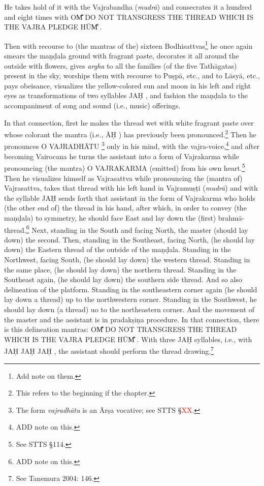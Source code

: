 \documentclass[11pt]{book}
\makeatletter
\def\fakesc#1{%
  \begingroup%
  \xdef\fake@name{\csname\curr@fontshape/\f@size\endcsname}%
  \fontsize{1.3\fontdimen8\fake@name}{\baselineskip}\selectfont%
  \uppercase{#1}%
  \endgroup%
}
\newcommand{\mantra}[1]{\fakesc{#1}}
\newcommand{\red}[1]{\textcolor{red}{#1}}
\newcommand{\skt}[1]{\emph{#1}}
\makeatother
\begin{document}
He takes hold of it with the Vajrabandha (\skt{mudrā}) and consecrates it a hundred and eight times with \mantra{om̐ do not transgress the thread which is the vajra pledge hūm̐}.

Then with recourse to (the mantras of the) sixteen Bodhisattvas\footnote{Add note on them.} he once again smears the maṇḍala ground with fragrant paste, decorates it all around the outside with flowers, gives \skt{argha} to all the families (of the five Tathāgatas) present in the sky, worships them with recourse to Puṣpā, etc., and to Lāsyā, etc., pays obeisance, visualizes the yellow-colored sun and  moon in his left and right eyes as transformations of two syllables \mantra{jaḥ}, and fashion the maṇḍala to the accompaniment of song and sound (i.e., music) offerings.

In that connection, first he makes the thread wet with white fragrant paste over whose colorant the mantra (i.e., \mantra{āḥ}) has previously been pronounced.\footnote{This refers to the beginning if the chapter.} Then he pronounces \mantra{o vajradhātu}\footnote{The form \skt{vajradhātu} is an Ārṣa vocative; see STTS §\red{XX}.} only in his mind, with the vajra-voice,\footnote{ADD note on this.} and after becoming Vairocana he turns the assistant into a form of Vajrakarma while pronouncing (the mantra) \mantra{o vajrakarma} (emitted) from his own heart.\footnote{See STTS §114.} Then he visualizes himself as Vajrasattva while pronouncing the (mantra of) Vajrasattva, takes that thread with his left hand in Vajramuṣṭi (\skt{mudrā}) and with the syllable \mantra{jaḥ} sends forth that assistant in the form of Vajrakarma who holds (the other end of) the thread in his hand, after which, in order to convey (the maṇḍala) to symmetry, he should face East and lay down the (first) brahmā-thread.\footnote{ADD note on this.} Next, standing in the South and facing North, the master (should lay down) the second. Then, standing in the Southeast, facing North, (he should lay down) the Eastern thread of the outside of the maṇḍala. Standing in the Northwest, facing South, (he should lay down) the western thread. Standing in the same place, (he should lay down) the northern thread. Standing in the Southeast again, (he should lay down) the southern side thread. And so also delineation of the platform. Standing in the southeastern corner again (he should lay down a thread) up to the northwestern corner. Standing in the Southwest, he should lay down (a thread) uo to the northeastern corner. And the movement of the master and the assistant is in pradakṣiṇa procedure. In that connection, there is this delineation mantras: \mantra{om̐ do not transgress the thread which is the vajra pledge hūm̐}. With three \mantra{jaḥ} syllables, i.e., with \mantra{jaḥ jaḥ jaḥ}, the assistant should perform the thread drawing.\footnote{See Tanemura 2004: 146.}
\end{document}
